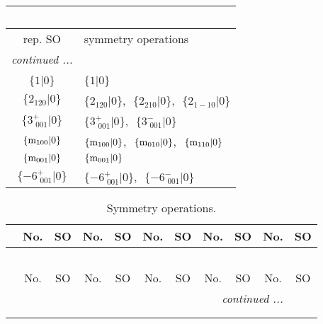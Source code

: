 \documentclass[fleqn,10pt,landscape]{article}
\begin{document}
\begin{itemize}
\begin{center}
\begin{longtable}{c|l}
\multicolumn{1}{l}{\tablename\ \thetable{}} \\
 \hline \hline
rep. SO & symmetry operations \\ \hline \endhead

 \hline \hline
\multicolumn{1}{r}{\footnotesize\it continued ...} \\ \endfoot

 \hline \hline
\multicolumn{1}{r}{} \\ \endlastfoot

$\{1|0\}$ & $\{1|0\}$ \\ \hline
$\{2{}_{120}|0\}$ & $\{2{}_{120}|0\}$,\,\, $\{2{}_{210}|0\}$,\,\, $\{2{}_{1-10}|0\}$ \\ \hline
$\{3^{+}_{\,\,001}|0\}$ & $\{3^{+}_{\,\,001}|0\}$,\,\, $\{3^{-}_{\,\,001}|0\}$ \\ \hline
$\{{\rm m}_{100}|0\}$ & $\{{\rm m}_{100}|0\}$,\,\, $\{{\rm m}_{010}|0\}$,\,\, $\{{\rm m}_{110}|0\}$ \\ \hline
$\{{\rm m}_{001}|0\}$ & $\{{\rm m}_{001}|0\}$ \\ \hline
$\{-6^{+}_{\,\,001}|0\}$ & $\{-6^{+}_{\,\,001}|0\}$,\,\, $\{-6^{-}_{\,\,001}|0\}$ \\
\end{longtable}
\end{center}
\begin{center}
\renewcommand{\arraystretch}{1.3}
\begin{longtable}{c|cc|cc|cc|cc|cc}
\caption{Symmetry operations.}
 \\
 \hline \hline
 & No. & SO & No. & SO & No. & SO & No. & SO & No. & SO \\ \hline \endfirsthead

\multicolumn{10}{l}{\tablename\ \thetable{}} \\
 \hline \hline
 & No. & SO & No. & SO & No. & SO & No. & SO & No. & SO \\ \hline \endhead

 \hline \hline
\multicolumn{10}{r}{\footnotesize\it continued ...} \\ \endfoot

 \hline \hline
\multicolumn{10}{r}{} \\ \endlastfoot


\end{longtable}
\end{center}
\end{itemize}
\end{document}

